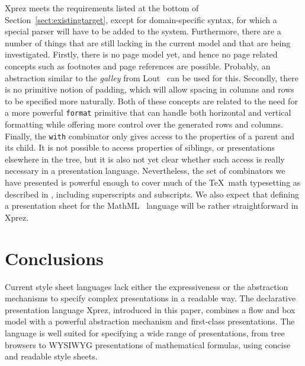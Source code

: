 {\sc Xprez} meets the requirements listed at the bottom of Section~\ref{sect:existingtarget}, except for domain-specific syntax, for which a special parser will have to be added to the system. Furthermore, there are a number of things that are still lacking in the current model and that are being investigated. Firstly, there is no page model yet, and hence no page related concepts such as footnotes and page references are possible. Probably, an abstraction similar to the {\em galley} from Lout~\cite{kingston93lout} can be used for this. Secondly, there is no primitive notion of padding, which will allow spacing in columns and rows to be specified more naturally. Both of these concepts are related to the need for a more powerful \texttt{format} primitive that can handle both horizontal and vertical formatting while offering more control over the generated rows and columns. Finally, the \texttt{with} combinator only gives access to the properties of a parent and its child. It is not possible to access properties of siblings, or presentations elsewhere in the tree, but it is also not yet clear whether such access is really necessary in a presentation language. Nevertheless, the set of combinators we have presented is powerful enough to cover much of the \TeX~math typesetting as described in \cite{heckmann97functionalTex}, including superscripts and subscripts. We also expect that defining a presentation sheet for the MathML~\cite{mathml20} language will be rather straightforward in {\sc Xprez}.


%																
%																
%																
\section{Conclusions} \label{sect:conclusions}

Current style sheet languages lack either the expressiveness or the abstraction mechanisms to specify complex presentations in a readable way. The declarative presentation language {\sc Xprez}, introduced in this paper, combines a flow and box model with a powerful abstraction mechanism and first-class presentations. The language is well suited for specifying a wide range of presentations, from tree browsers to WYSIWYG presentations of mathematical formulas, using concise and readable style sheets.



